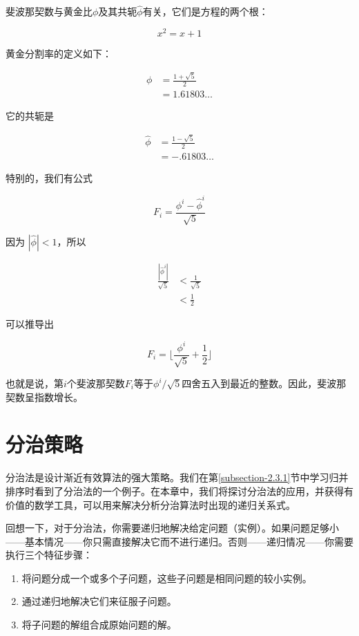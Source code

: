 \documentclass[lang=cn,newtx,10pt,scheme=chinese]{elegantbook}
\begin{document}
斐波那契数与黄金比$\phi$及其共轭$\hat{\phi}$有关，它们是方程的两个根：

$$
x^2=x+1
$$

黄金分割率的定义如下：

\begin{equation}
\begin{aligned}
\phi & =\frac{1+\sqrt{5}}{2} \\
& =1.61803 \ldots
\end{aligned}
\end{equation}

它的共轭是

\begin{equation}
\begin{aligned}
\widehat{\phi} & =\frac{1-\sqrt{5}}{2} \\
& =-.61803 \ldots
\end{aligned}
\end{equation}

特别的，我们有公式

$$
F_i=\frac{\phi^i-\widehat{\phi}^i}{\sqrt{5}}
$$

因为 $|\hat{\phi}|<1$，所以

$$
\begin{aligned}
\frac{|\hat{\phi}^i|}{\sqrt{5}} & <\frac{1}{\sqrt{5}} \\
& <\frac{1}{2}
\end{aligned}
$$

可以推导出

\begin{equation}
F_i=\lfloor\frac{\phi^i}{\sqrt{5}}+\frac{1}{2}\rfloor
\end{equation}

也就是说，第$i$个斐波那契数$F_i$等于$\phi^i / \sqrt{5}$四舍五入到最近的整数。因此，斐波那契数呈指数增长。

\chapter{分治策略}\label{chapter-04}

分治法是设计渐近有效算法的强大策略。我们在第\ref{subsection-2.3.1}节中学习归并排序时看到了分治法的一个例子。在本章中，我们将探讨分治法的应用，并获得有价值的数学工具，可以用来解决分析分治算法时出现的递归关系式。

回想一下，对于分治法，你需要递归地解决给定问题（实例）。如果问题足够小——基本情况——你只需直接解决它而不进行递归。否则——递归情况——你需要执行三个特征步骤：

\begin{enumerate}
\item 将问题分成一个或多个子问题，这些子问题是相同问题的较小实例。
\item 通过递归地解决它们来征服子问题。
\item 将子问题的解组合成原始问题的解。
\end{enumerate}
\end{document}
